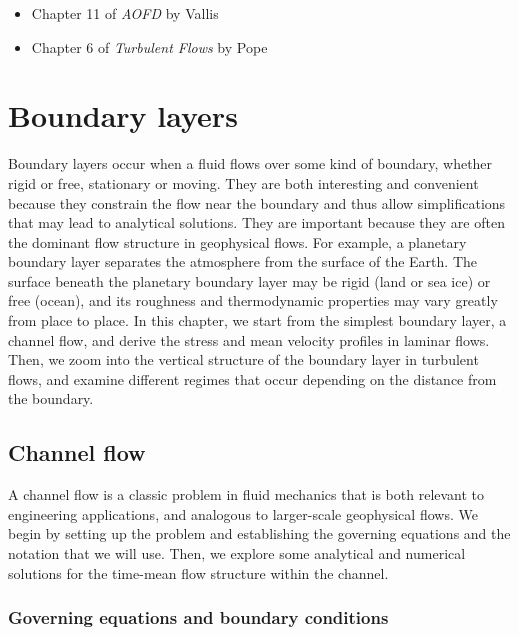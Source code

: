 \documentclass[12pt]{article}
\numberwithin{equation}{section}
\numberwithin{figure}{section}
\numberwithin{table}{section}
\begin{document}
\begin{itemize}
  \item Chapter 11 of \textit{AOFD} by Vallis
  \item Chapter 6 of \textit{Turbulent Flows} by Pope
\end{itemize}

\newpage
\section{Boundary layers}

Boundary layers occur when a fluid flows over some kind of boundary, whether
rigid or free, stationary or moving.
They are both interesting and convenient because they constrain the flow near
the boundary and thus allow simplifications that may lead to analytical solutions.
They are important because they are often the dominant flow structure in geophysical
flows.
For example, a planetary boundary layer separates the atmosphere from the surface
of the Earth.
The surface beneath the planetary boundary layer may be rigid (land or sea ice)
or free (ocean), and its roughness and thermodynamic properties may vary greatly
from place to place.
In this chapter, we start from the simplest boundary layer, a channel flow, and
derive the stress and mean velocity profiles in laminar flows.
Then, we zoom into the vertical structure of the boundary layer in turbulent
flows, and examine different regimes that occur depending on the distance from
the boundary.

\subsection{Channel flow}

A channel flow is a classic problem in fluid mechanics that is both relevant to
engineering applications, and analogous to larger-scale geophysical flows.
We begin by setting up the problem and establishing the governing equations
and the notation that we will use.
Then, we explore some analytical and numerical solutions for the time-mean
flow structure within the channel.

\subsubsection{Governing equations and boundary conditions}
\end{document}
